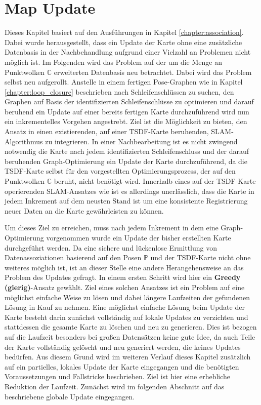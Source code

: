 \chapter{Map Update}
\label{chapter:map_update}

Dieses Kapitel basiert auf den Ausführungen in Kapitel \ref{chapter:association}. Dabei wurde herausgestellt, dass ein Update der Karte ohne eine zusätzliche Datenbasis in der Nachbehandlung aufgrund einer Vielzahl an Problemen nicht möglich ist. Im Folgenden wird das Problem auf der um die Menge an Punktwolken $\mathbb{C}$ erweiterten Datenbasis neu betrachtet. Dabei wird das Problem selbst neu aufgerollt. Anstelle in einem fertigen Pose-Graphen wie in Kapitel \ref{chapter:loop_closure} beschrieben nach Schleifenschlüssen zu suchen, den Graphen auf Basis der identifizierten Schleifenschlüsse zu optimieren und darauf beruhend ein Update auf einer bereits fertigen Karte durchzuführend wird nun ein inkrementelles Vorgehen angestrebt. Ziel ist die Möglichkeit zu bieten, den Ansatz in einen existierenden, auf einer TSDF-Karte beruhenden, SLAM-Algorithmus zu integrieren. In einer Nachbearbeitung ist es nicht zwingend notwendig die Karte nach jedem identifizierten Schleifenschluss und der darauf beruhenden Graph-Optimierung ein Update der Karte durchzuführend, da die TSDF-Karte selbst für den vorgestellten Optimierungsprozess, der auf den Punktwolken $\mathbb{C}$ beruht, nicht benötigt wird. Innerhalb eines auf der TSDF-Karte operierenden SLAM-Ansatzes wie \cite{HATSDF} ist es allerdings unerlässlich, dass die Karte in jedem Inkrement auf dem neusten Stand ist um eine konsistente Registrierung neuer Daten an die Karte gewährleisten zu können.

Um dieses Ziel zu erreichen, muss nach jedem Inkrement in dem eine Graph-Optimierung vorgenommen wurde ein Update der bisher erstellten Karte durchgeführt werden. Da eine sichere und lückenlose Ermittlung von Datenassoziationen basierend auf den Posen $\mathbb{P}$ und der TSDF-Karte nicht ohne weiteres möglich ist, ist an dieser Stelle eine andere Herangehensweise an das Problem des Updates gefragt. In einem ersten Schritt wird hier ein \textbf{Greedy (gierig)}-Ansatz gewählt. Ziel eines solchen Ansatzes ist ein Problem auf eine möglichst einfache Weise zu lösen und dabei längere Laufzeiten der gefundenen Lösung in Kauf zu nehmen. Eine möglichst einfache Lösung beim Update der Karte besteht darin zunächst vollständig auf lokale Updates zu verzichten und stattdessen die gesamte Karte zu löschen und neu zu generieren. Dies ist bezogen auf die Laufzeit besonders bei großen Datensätzen keine gute Idee, da auch Teile der Karte vollständig gelöscht und neu generiert werden, die keines Updates bedürfen. Aus diesem Grund wird im weiteren Verlauf dieses Kapitel zusätzlich auf ein partielles, lokales Update der Karte eingegangen und die benötigten Voraussetzungen und Fallstricke beschrieben. Ziel ist hier eine erhebliche Reduktion der Laufzeit. Zunächst wird im folgenden Abschnitt auf das beschriebene globale Update eingegangen.

